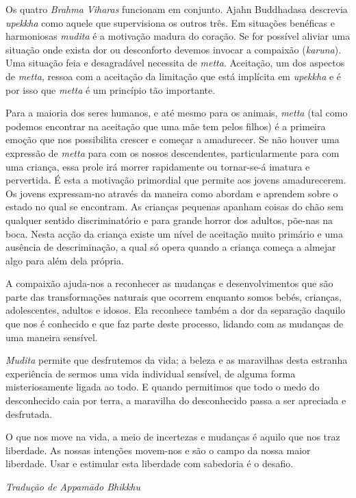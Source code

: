 Os quatro \emph{Brahma Viharas} funcionam em conjunto. Ajahn Buddhadasa
descrevia \emph{upekkha} como aquele que supervisiona os outros três. Em
situações benéficas e harmoniosas \emph{mudita} é a motivação madura do
coração. Se for possível aliviar uma situação onde exista dor ou
desconforto devemos invocar a compaixão (\emph{karuna}). Uma situação
feia e desagradável necessita de \emph{metta}. Aceitação, um dos
aspectos de \emph{metta}, ressoa com a aceitação da limitação que está
implícita em \emph{upekkha} e é por isso que \emph{metta} é um princípio
tão importante.

Para a maioria dos seres humanos, e até mesmo para os animais,
\emph{metta} (tal como podemos encontrar na aceitação que uma mãe tem
pelos filhos) é a primeira emoção que nos possibilita crescer e começar
a amadurecer. Se não houver uma expressão de \emph{metta} para com os
nossos descendentes, particularmente para com uma criança, essa prole
irá morrer rapidamente ou tornar-se-á imatura e pervertida. É esta a
motivação primordial que permite aos jovens amadurecerem. Os jovens
expressam-no através da maneira como abordam e aprendem sobre o estado
no qual se encontram. As crianças pequenas apanham coisas do chão sem
qualquer sentido discriminatório e para grande horror dos adultos,
põe-nas na boca. Nesta acção da criança existe um nível de aceitação
muito primário e uma ausência de descriminação, a qual só opera quando a
criança começa a almejar algo para além dela própria.

A compaixão ajuda-nos a reconhecer as mudanças e desenvolvimentos que
são parte das transformações naturais que ocorrem enquanto somos bebés,
crianças, adolescentes, adultos e idosos. Ela reconhece também a dor da
separação daquilo que nos é conhecido e que faz parte deste processo,
lidando com as mudanças de uma maneira sensível.

\emph{Mudita} permite que desfrutemos da vida; a beleza e as maravilhas
desta estranha experiência de sermos uma vida individual sensível, de
alguma forma misteriosamente ligada ao todo. E quando permitimos que
todo o medo do desconhecido caia por terra, a maravilha do desconhecido
passa a ser apreciada e desfrutada.

O que nos move na vida, a meio de incertezas e mudanças é aquilo que nos
traz liberdade. As nossas intenções movem-nos e são o campo da nossa
maior liberdade. Usar e estimular esta liberdade com sabedoria é o
desafio.

\bigskip

{\raggedleft\itshape
  Tradução de Appamādo Bhikkhu
\par}